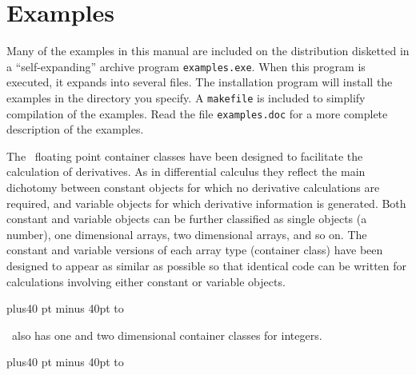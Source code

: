 \documentclass[12pt]{book}
\begin{document}
\section{Examples}
Many of the examples in this manual are included on the distribution
disketted in a ``self-expanding'' archive program {\tt examples.exe}. When
this program is executed, it expands into  several files. 
The installation program will install the examples in the directory you
specify. A {\tt makefile} is included to simplify compilation of the
examples.
Read the file {\tt examples.doc} for a more complete description of the
examples.

\endchapter

\htmlnewfile 

   
The \AD\ floating point container classes have been designed to
facilitate the calculation of derivatives. As in differential calculus
they reflect
the main dichotomy between constant objects for which no derivative
calculations are required, and variable objects for which derivative
information is generated.  
Both constant and variable objects can be
further classified as single objects (a number), one dimensional arrays,
two dimensional arrays, and so on. The constant
and variable versions of each array type (container class) have
been designed to appear as similar as possible so that identical
code can be written for calculations involving either constant or
variable objects.

\vbox{\openup 3pt\tabskip=40pt plus40 pt minus 40pt
 \halign to  }%


\AD\ also has one and two dimensional container classes for integers.

\vbox{\openup 3pt\tabskip=40pt plus40 pt minus 40pt
 \halign to }%
\end{document}

